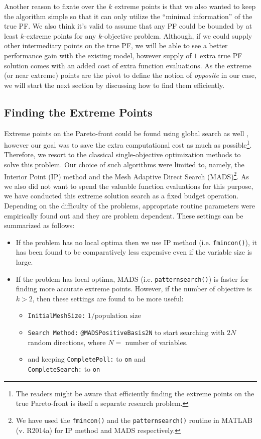\documentclass[journal]{IEEEtran}
\begin{document}
Another reason to fixate over the \(k\) extreme points is that we also wanted to keep the algorithm simple so that it can only utilize the ``minimal information'' of the true PF. We also think it's valid to assume that any PF could be bounded by at least \(k\)-extreme points for any \(k\)-objective problem. Although, if we could supply other intermediary points on the true PF, we will be able to see a better performance gain with the existing model, however supply of \(1\) extra true PF solution comes with an added cost of extra function evaluations. As the extreme (or near extreme) points are the pivot to define the notion of \textit{opposite} in our case, we will start the next section by discussing how to find them efficiently.

\subsection{Finding the Extreme Points}
\label{sec:find-extreme-points}
Extreme points on the Pareto-front could be found using global search as well \cite{nadir-estimation}, however our goal was to save the extra computational cost as much as possible\footnote{The readers might be aware that efficiently finding the extreme points on the true Pareto-front is itself a separate research problem.}. Therefore, we resort to the classical single-objective optimization methods to solve this problem. Our choice of such algorithms were limited to, namely, the Interior Point (IP) method and the Mesh Adaptive Direct Search (MADS)\footnote{We have used the \texttt{fmincon()} and the \texttt{patternsearch()} routine in MATLAB (v. R2014a) for IP method and MADS respectively.}. As we also did not want to spend the valuable function evaluations for this purpose, we have conducted this extreme solution search as a fixed budget operation. Depending on the difficulty of the problems, appropriate routine parameters were empirically found out and they are problem dependent. These settings can be summarized as follows: 
%
\begin{itemize}
	\item If the problem has no local optima then we use IP method (i.e. \texttt{fmincon()}), it has been found to be comparatively less expensive even if the variable size is large.
	\item If the problem has local optima, MADS (i.e. \texttt{patternsearch()}) is faster for finding more accurate extreme points. However, if the number of objective is $k > 2$, then these settings are found to be more useful:
		\begin{itemize}
			\item \texttt{InitialMeshSize:} \(1/\text{population size}\)
			\item \texttt{Search Method:} \texttt{@MADSPositiveBasis2N} to start searching with $2N$ random directions, where $N =$ number of variables.
			\item and keeping \texttt{CompletePoll:} to \texttt{on} and\\ \texttt{CompleteSearch:} to \texttt{on}
		\end{itemize}
\end{itemize}
\end{document}
